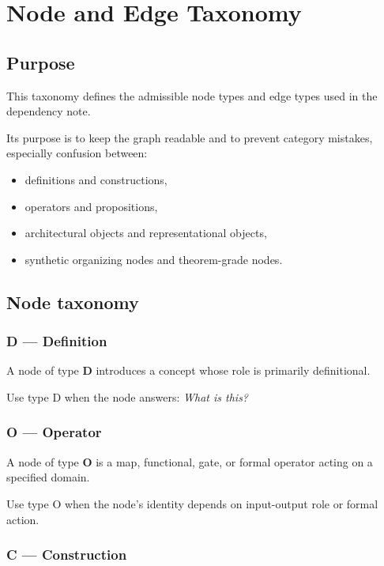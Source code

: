 \documentclass[11pt,a4paper]{article}
\begin{document}
	\section{Node and Edge Taxonomy}
	
	\subsection{Purpose}
	
	This taxonomy defines the admissible node types and edge types used in the dependency note.
	
	Its purpose is to keep the graph readable and to prevent category mistakes, especially confusion
	between:
	\begin{itemize}[leftmargin=2em]
		\item definitions and constructions,
		\item operators and propositions,
		\item architectural objects and representational objects,
		\item synthetic organizing nodes and theorem-grade nodes.
	\end{itemize}
	
	\subsection{Node taxonomy}
	
	\subsubsection*{D --- Definition}
	
	A node of type \textbf{D} introduces a concept whose role is primarily definitional.
	
	Use type D when the node answers: \emph{What is this?}
	
	\subsubsection*{O --- Operator}
	
	A node of type \textbf{O} is a map, functional, gate, or formal operator acting on a specified domain.
	
	Use type O when the node's identity depends on input-output role or formal action.
	
	\subsubsection*{C --- Construction}
	
\end{document}
